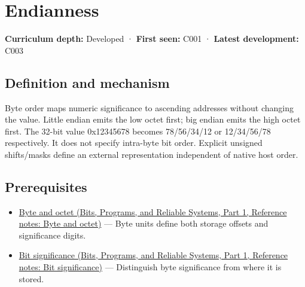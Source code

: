 \hypertarget{appendix-bc07c3d25b18}{}\label{referencestart:appendix-bc07c3d25b18}
\section{Endianness}\label{appendix-bc07c3d25b18-endianness}

\hypertarget{appendix-bc07c3d25b18-endianness}{}

\textbf{Curriculum depth:} Developed · \textbf{First seen:} C001 · \textbf{Latest development:} C003

\begin{allmightroledefinition}

\subsection{Definition and mechanism}\label{appendix-bc07c3d25b18-definition-and-mechanism}

\hypertarget{appendix-bc07c3d25b18-definition-and-mechanism}{}

Byte order maps numeric significance to ascending addresses without changing the value. Little endian emits the low octet first; big endian emits the high octet first. The 32-bit value 0x12345678 becomes 78/56/34/12 or 12/34/56/78 respectively. It does not specify intra-byte bit order. Explicit unsigned shifts/masks define an external representation independent of native host order.

\end{allmightroledefinition}

\subsection{Prerequisites}\label{appendix-bc07c3d25b18-prerequisites}

\hypertarget{appendix-bc07c3d25b18-prerequisites}{}

\begin{itemize}
\tightlist
\item
  \href{../01-Bits-Programs-and-Reliable-Systems-P01/main.pdf\#nameddest=appendix-5bee2df85484}{Byte and octet (Bits, Programs, and Reliable Systems, Part 1, Reference notes: Byte and octet)} --- Byte units define both storage offsets and significance digits.
\item
  \href{../01-Bits-Programs-and-Reliable-Systems-P01/main.pdf\#nameddest=appendix-280445746493}{Bit significance (Bits, Programs, and Reliable Systems, Part 1, Reference notes: Bit significance)} --- Distinguish byte significance from where it is stored.
\end{itemize}


